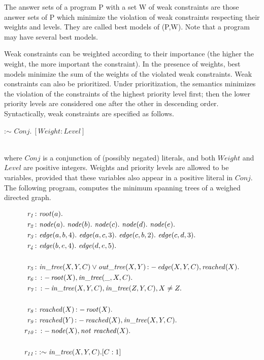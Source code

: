 \documentclass[a4paper, titlepage]{article}
\DeclareMathOperator{\leftimpl}{:-}
\newcommand{\row}[1]{%
  \ensuremath{\it \color{black} #1 \color{black}}%
}
\begin{document}
The answer sets of a program P with a set W of weak 
constraints are those answer sets of P which minimize the 
violation of weak constraints respecting their weights and 
levels. They are called best models of (P,W). Note that a 
program may have several best models.


Weak constraints can be weighted according to their 
importance (the higher the weight, the more important the 
constraint). In the presence of weights, best models 
minimize the sum of the weights of the violated weak 
constraints. Weak constraints can also be prioritized. 
Under prioritization, the semantics minimizes the violation 
of the constraints of the highest priority level first; 
then the lower priority levels are considered one after the 
other in descending order. Syntactically, weak constraints 
are specified as follows. \\ \centerline{:$\sim$ $\mathit{Conj}. \  
[\mathit{Weight}\colon\mathit{Level}]$} \\ where $\mathit{Conj}$ 
is a conjunction of (possibly negated) literals, and both 
$\mathit{Weight}$ and $\mathit{Level}$ are positive 
integers. Weights and priority levels are allowed to be 
variables, provided that these variables also appear in a 
positive literal in $\mathit{Conj}$.
The following program, computes the minimum spanning trees 
of a weighed directed graph.
\begin{exmp}
\begin{align*}
\row{r_1}\colon& \mathit{root}(a). \\
\row{r_2}\colon& \mathit{node}(a). \ \mathit{node}(b). \ 
\mathit{node}(c). \ \mathit{node}(d). \ \mathit{node}(e). \ \\
\row{r_3}\colon& \mathit{edge}(a,b,4). \ \mathit{edge}(a,c,3). \ 
\mathit{edge}(c,b,2). \ \mathit{edge}(c,d,3). \ \\
\row{r_4}\colon& \mathit{edge}(b,e,4). \ \mathit{edge}(d,e,5). \ \\
\\
\row{r_5} \colon & \mathit{in\_tree}(X,Y,C) \vee 
\mathit{out\_tree}(X,Y) \leftimpl \mathit{edge}(X,Y,C), 
\mathit{reached}(X). \\
\row{r_6}\colon& \leftimpl \mathit{root}(X), \mathit{in\_tree}
(\_,X,C).\\
\row{r_7}\colon& \leftimpl \mathit{in\_tree}(X,Y,C), 
\mathit{in\_tree}(Z,Y,C), X \neq Z. \\
\\
\row{r_8}\colon& \mathit{reached}(X) \leftimpl \mathit{root}
(X). \\
\row{r_9}\colon& \mathit{reached}(Y) \leftimpl 
\mathit{reached}(X), \mathit{in\_tree}(X,Y,C). \\
\row{r_{10}}\colon& \leftimpl \mathit{node}(X), \mathit{not} \ 
\mathit{reached}(X). \\
\\
\row{r_{11}}\colon&\mathit{ : \sim in\_tree}(X,Y,C). [C:1]
\end{align*}
\end{exmp}
\end{document}
